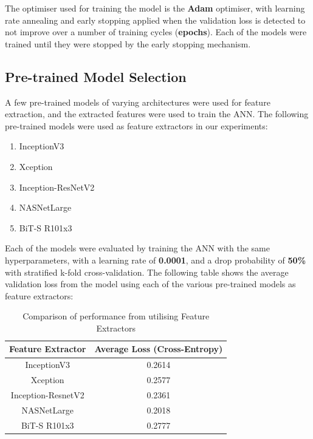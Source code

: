 \documentclass[sigconf,nonacm=true]{acmart}
\begin{document}
The optimiser used for training the model is the \textbf{Adam} optimiser, with learning rate annealing and early stopping 
applied when the validation loss is detected to not improve over a number of training cycles (\textbf{epochs}). Each of the 
models were trained until they were stopped by the early stopping mechanism.

\subsection{Pre-trained Model Selection}
\label{section:pretrainedmodels}
A few pre-trained models of varying architectures were used for feature extraction, and the extracted features
were used to train the ANN. The following pre-trained models were used as feature extractors in our experiments:

\begin{enumerate}
	\item InceptionV3 \cite{szegedy2015rethinking}
	\item Xception \cite{chollet2017xception}
	\item Inception-ResNetV2 \cite{szegedy2016inceptionv4}
	\item NASNetLarge \cite{zoph2018learning}
	\item BiT-S R101x3 \cite{kolesnikov2020big}
\end{enumerate}

Each of the models were evaluated by training the ANN with the same hyperparameters, with a learning rate of 
\textbf{0.0001}, and a drop probability of \textbf{50\%} with stratified k-fold cross-validation.
The following table shows the average validation loss from the model using each of the various 
pre-trained models as feature extractors:

\begin{table}[H]
	\begin{tabular}{cc}
		\toprule
		Feature Extractor&Average Loss (Cross-Entropy)\\
		\midrule
		InceptionV3 & 0.2614\\
		Xception & 0.2577\\
		Inception-ResnetV2 & 0.2361\\
		NASNetLarge & 0.2018\\
		BiT-S R101x3 & 0.2777\\
		\bottomrule
	\end{tabular}
	\caption{Comparison of performance from utilising Feature Extractors}
	\label{tab:featperf}
\end{table}
\end{document}
